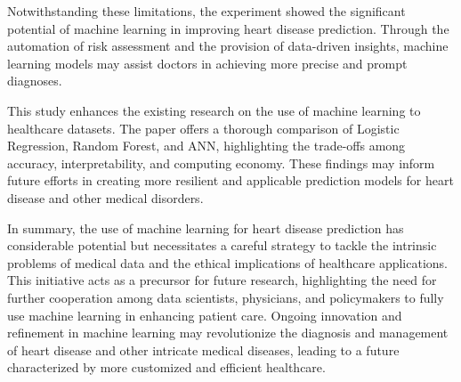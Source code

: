 Notwithstanding these limitations, the experiment showed the significant potential of machine learning in improving heart disease prediction. Through the automation of risk assessment and the provision of data-driven insights, machine learning models may assist doctors in achieving more precise and prompt diagnoses.

This study enhances the existing research on the use of machine learning to healthcare datasets. The paper offers a thorough comparison of Logistic Regression, Random Forest, and ANN, highlighting the trade-offs among accuracy, interpretability, and computing economy. These findings may inform future efforts in creating more resilient and applicable prediction models for heart disease and other medical disorders.

In summary, the use of machine learning for heart disease prediction has considerable potential but necessitates a careful strategy to tackle the intrinsic problems of medical data and the ethical implications of healthcare applications. This initiative acts as a precursor for future research, highlighting the need for further cooperation among data scientists, physicians, and policymakers to fully use machine learning in enhancing patient care. Ongoing innovation and refinement in machine learning may revolutionize the diagnosis and management of heart disease and other intricate medical diseases, leading to a future characterized by more customized and efficient healthcare.
